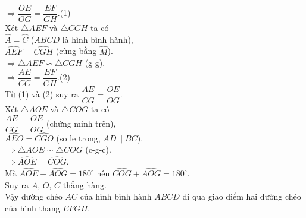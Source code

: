 \begin{vd}
{{
		}
		\noindent $\Rightarrow \dfrac{OE}{OG}=\dfrac{EF}{GH}$.\qquad (1)\\
		Xét $\triangle AEF$ và $\triangle CGH$ ta có\\
		$\widehat{A}=\widehat{C}$ ($ABCD$ là hình bình hành),\\
		$\widehat{AEF}=\widehat{CGH}$ (cùng bằng $\widehat{M}$).\\
		$\Rightarrow \triangle AEF \backsim \triangle CGH$ (g-g).\\
		$\Rightarrow \dfrac{AE}{CG}=\dfrac{EF}{GH}$.\qquad (2)\\
		Từ (1) và (2) suy ra $\dfrac{AE}{CG}=\dfrac{OE}{OG}$.\\
		Xét $\triangle AOE$ và $\triangle COG$ ta có\\
		$\dfrac{AE}{CG}=\dfrac{OE}{OG}$ (chứng minh trên),\\
		$\widehat{AEO}=\widehat{CGO}$ (so le trong, $AD\parallel BC$).\\
		$\Rightarrow \triangle AOE \backsim \triangle COG$ (c-g-c).\\
		$\Rightarrow \widehat{AOE}=\widehat{COG}$.\\
		Mà $\widehat{AOE}+ \widehat{AOG}=180^\circ$ nên $\widehat{COG}+ \widehat{AOG}=180^\circ$.\\
		Suy ra $A$, $O$, $C$ thẳng hàng.\\
		Vậy đường chéo $AC$ của hình bình hành $ABCD$ đi qua giao điểm hai đường chéo của hình thang $EFGH$.
	}
\end{vd}
